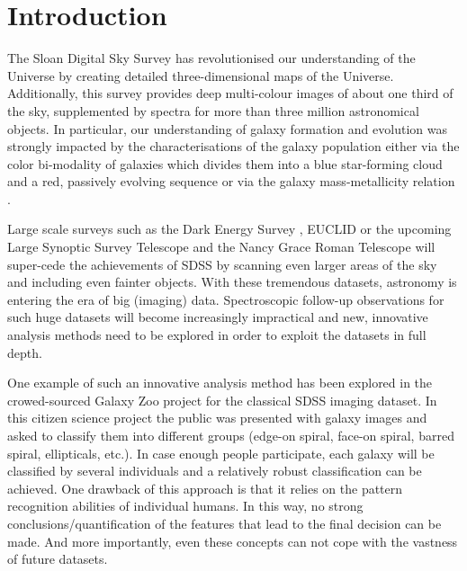 \documentclass[useAMS,usenatbib]{mnras}
\begin{document}
\section{Introduction} \label{sec:intro}

The Sloan Digital Sky Survey \citep{SDSS} has revolutionised our understanding of the Universe by creating detailed three-dimensional maps of the Universe. Additionally, this survey provides deep multi-colour images of about one third of the sky, supplemented by spectra for more than three million astronomical objects. In particular, our understanding of galaxy formation and evolution was strongly impacted by the characterisations of the galaxy population either via the color bi-modality of galaxies \citep[e.g.][]{Strateva2001} which divides them into a blue star-forming cloud and a red, passively evolving sequence or via the galaxy mass-metallicity relation \citep{Tremonti2004}.

Large scale surveys such as the Dark Energy Survey \citep{DES2005}, EUCLID or the upcoming Large Synoptic Survey Telescope \citep{LSST2019} and the Nancy Grace Roman Telescope will super-cede the achievements of SDSS by scanning even larger areas of the sky and including even fainter objects. With these tremendous datasets, astronomy is entering the era of big (imaging) data. Spectroscopic follow-up observations for such huge datasets will become increasingly impractical and new, innovative analysis methods need to be explored in order to exploit the datasets in full depth.

One example of such an innovative analysis method has been explored in the crowed-sourced Galaxy Zoo project \citep{galaxyzoo2008} for the classical SDSS imaging dataset. In this citizen science project the public was presented with galaxy images and asked to classify them into different groups (edge-on spiral, face-on spiral, barred spiral, ellipticals, etc.). In case enough people participate, each galaxy will be classified by several individuals and a relatively robust classification can be achieved. One drawback of this approach is that it relies on the pattern recognition abilities of individual humans. In this way, no strong conclusions/quantification of the features that lead to the final decision can be made. And more importantly, even these concepts can not cope with the vastness of future datasets.
\end{document}
